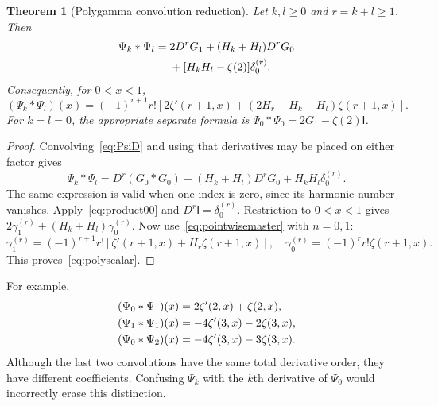 \documentclass[11pt]{article}
\numberwithin{equation}{section}
\newtheorem{theorem}{Theorem}[section]
\theoremstyle{definition}
\theoremstyle{remark}
\newcommand{\Id}{\mathsf I}
\begin{document}
\begin{theorem}[Polygamma convolution reduction]\label{thm:polygamma}
Let $k,l\ge0$ and $r=k+l\ge1$. Then
\begin{align}
 \Psi_k*\Psi_l={}&2D^rG_1+(H_k+H_l)D^rG_0\label{eq:polyfull}\\
 &+[H_kH_l-\zeta(2)]\delta_0^{(r)}.\notag
\end{align}
Consequently, for $0<x<1$,
\begin{equation}\label{eq:polyscalar}
 (\Psi_k*\Psi_l)(x)=(-1)^{r+1}r!
 \left[2\zeta'(r+1,x)+(2H_r-H_k-H_l)\zeta(r+1,x)\right].
\end{equation}
For $k=l=0$, the appropriate separate formula is
$\Psi_0*\Psi_0=2G_1-\zeta(2)\Id$.
\end{theorem}
\begin{proof}
Convolving~\eqref{eq:PsiD} and using that derivatives may be placed on
either factor gives
\[
 \Psi_k*\Psi_l=D^r(G_0*G_0)
 +(H_k+H_l)D^rG_0+H_kH_l\delta_0^{(r)}.
\]
The same expression is valid when one index is zero, since its harmonic
number vanishes. Apply~\eqref{eq:product00} and
$D^r\Id=\delta_0^{(r)}$. Restriction to $0<x<1$ gives
$2\gamma_1^{(r)}+(H_k+H_l)\gamma_0^{(r)}$.
Now use~\eqref{eq:pointwisemaster} with $n=0,1$:
\[
 \gamma_1^{(r)}=(-1)^{r+1}r![\zeta'(r+1,x)+H_r\zeta(r+1,x)],
 \quad \gamma_0^{(r)}=(-1)^rr!\zeta(r+1,x).
\]
This proves~\eqref{eq:polyscalar}.
\end{proof}

For example,
\begin{align}
 (\Psi_0*\Psi_1)(x)&=2\zeta'(2,x)+\zeta(2,x),\label{eq:polyexamples}\\
 (\Psi_1*\Psi_1)(x)&=-4\zeta'(3,x)-2\zeta(3,x),\notag\\
 (\Psi_0*\Psi_2)(x)&=-4\zeta'(3,x)-3\zeta(3,x).\notag
\end{align}
Although the last two convolutions have the same total derivative order,
they have different coefficients. Confusing $\Psi_k$ with the $k$th
derivative of $\Psi_0$ would incorrectly erase this distinction.
\end{document}
